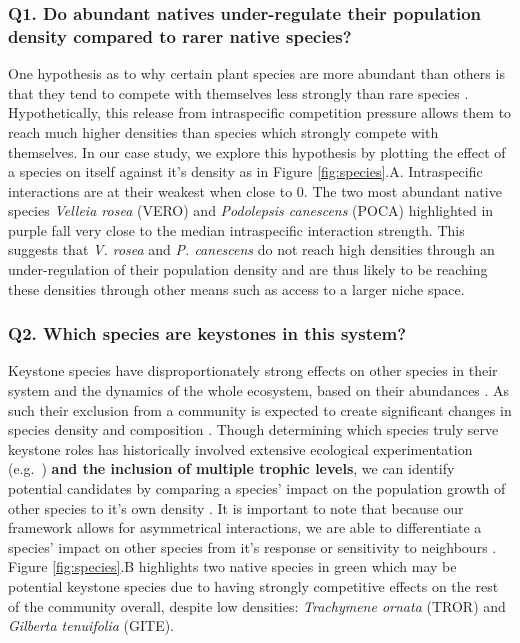 \documentclass[a4,12pt]{article}
\begin{document}
\begin{refsection}
    \subsubsection*{Q1. Do abundant natives under-regulate their population density compared to rarer native species?}
    One hypothesis as to why certain plant species are more abundant than others is that they tend to compete with themselves less strongly than rare species \parencite{Yenni2012, Yenni2017}. Hypothetically, this release from intraspecific competition pressure allows them to reach much higher densities than species which strongly compete with themselves. In our case study, we explore this hypothesis by plotting the effect of a species on itself against it's density as in Figure \ref{fig:species}.A. Intraspecific interactions are at their weakest when close to $0$. The two most abundant native species \textit{Velleia rosea} (VERO) and \textit{Podolepsis canescens} (POCA) highlighted in purple fall very close to the median intraspecific interaction strength. This suggests that \textit{V. rosea} and \textit{P. canescens} do not reach high densities through an under-regulation of their population density and are thus likely to be reaching these densities through other means such as access to a larger niche space. 

    \subsubsection*{Q2. Which species are keystones in this system?}
    Keystone species have disproportionately strong effects on other species in their system and the dynamics of the whole ecosystem, based on their abundances \parencite{Power1996, Piraino2002, Libralato2006}. As such their exclusion from a community is expected to create significant changes in species density and composition \parencite{Paine1969}. Though determining which species truly serve keystone roles has historically involved extensive ecological experimentation (e.g.\ \cite{Paine1992}) \textbf{and the inclusion of multiple trophic levels}, we can identify potential candidates by comparing a species' impact on the population growth of other species to it's own density \parencite{Libralato2006}. It is important to note that because our framework allows for asymmetrical interactions, we are able to differentiate a species' impact on other species from it's response or sensitivity to neighbours \parencite{Broekman2020}. Figure \ref{fig:species}.B highlights two native species in green which may be potential keystone species due to having strongly competitive effects on the rest of the community overall, despite  low densities: \textit{Trachymene ornata} (TROR) and \textit{Gilberta tenuifolia} (GITE). 
    


\end{refsection}
\end{document}
